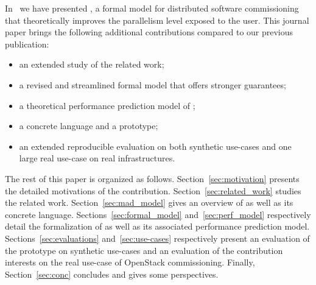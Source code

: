 In~\cite{chardet:hal-01858150} we have presented \mad, a formal model for distributed software commissioning that theoretically improves the parallelism
level exposed to the user. This journal paper brings the following additional
contributions compared to our previous publication: 
\begin{itemize}
	\item an extended study of the related work; %
	\item a revised and streamlined \mad formal model that offers stronger guarantees; 
	\item a theoretical performance prediction model of \mad; 
	\item a concrete language and a prototype;
	\item an extended reproducible evaluation on both synthetic use-cases and one large real use-case on real infrastructures.
\end{itemize}

The rest of this paper is organized as follows. Section~\ref{sec:motivation} presents the detailed motivations of the contribution. Section~\ref{sec:related_work} studies the related work. Section~\ref{sec:mad_model} gives an overview of \mad as well as its concrete language. Sections~\ref{sec:formal_model} and~\ref{sec:perf_model} respectively detail the formalization of \mad as well as its associated performance prediction model. Sections~\ref{sec:evaluations} and~\ref{sec:use-cases} respectively present an evaluation of the \mad prototype on synthetic use-cases and an evaluation of the contribution interests on the real use-case of OpenStack commissioning.  Finally, Section~\ref{sec:conc} concludes and gives some perspectives.




